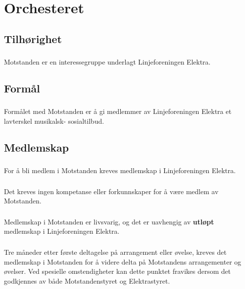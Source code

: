 \documentclass{article}
\newenvironment{statute}[1][]
    {
        \titleformat{\subsubsection}[runin]{\normalfont}{\hspace{1pt}\textit{\S\hspace{5pt}\thesubsubsection}}{0pt}{\rule{4pt}{0pt}}{}
        \subsubsection{}#1
        \begin{minipage}[t]{0.89\linewidth}
    }
    {
        \end{minipage}
        
        \ignorespacesafterend
    }
\begin{document}
    \section{Orchesteret}
        \subsection{Tilhørighet}
            \begin{statute}
                Motstanden er en interessegruppe underlagt Linjeforeningen Elektra.
            \end{statute}
        
        \subsection{Formål}
            \begin{statute}
                Formålet med Motstanden er å gi medlemmer av Linjeforeningen Elektra et lavterskel musikalsk- sosialtilbud.
        \end{statute}
        
        
        \subsection{Medlemskap}\label{medlemskap}
            \begin{statute}
                For å bli medlem i Motstanden kreves medlemskap i Linjeforeningen Elektra.
            \end{statute}
            \begin{statute}
                Det kreves ingen kompetanse eller forkunnskaper for å være medlem av Motstanden.
            \end{statute}
            \begin{statute}
                Medlemskap i Motstanden er livsvarig, og det er uavhengig av \textbf{utløpt} medlemskap i Linjeforeningen Elektra.            
            \end{statute}
        	\begin{statute}
        		Tre måneder etter første deltagelse på arrangement eller øvelse, kreves det medlemskap i 
        		Motstanden for å videre delta på Motstandens arrangementer og øvelser. Ved spesielle omstendigheter kan dette punktet fravikes dersom det godkjennes av både Motstandenstyret og Elektrastyret. 
        	\end{statute}
        
\end{document}
